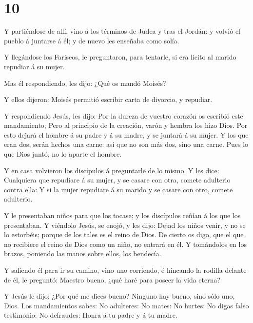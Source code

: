 \hypertarget{section-9}{%
\section{10}\label{section-9}}

 Y partiéndose de allí, vino á los términos de Judea y tras
el Jordán: y volvió el pueblo á juntarse á él; y de nuevo les enseñaba
como solía.

 Y llegándose los Fariseos, le preguntaron, para tentarle,
si era lícito al marido repudiar á su mujer.

 Mas él respondiendo, les dijo: ¿Qué os mandó Moisés?

 Y ellos dijeron: Moisés permitió escribir carta de
divorcio, y repudiar.

 Y respondiendo Jesús, les dijo: Por la dureza de vuestro
corazón os escribió este mandamiento;  Pero al principio de
la creación, varón y hembra los hizo Dios.  Por esto dejará
el hombre á su padre y á su madre, y se juntará á su mujer. 
Y los que eran dos, serán hechos una carne: así que no son más dos, sino
una carne.  Pues lo que Dios juntó, no lo aparte el hombre.

 Y en casa volvieron los discípulos á preguntarle de lo
mismo.  Y les dice: Cualquiera que repudiare á su mujer, y
se casare con otra, comete adulterio contra ella:  Y si la
mujer repudiare á su marido y se casare con otro, comete adulterio.

 Y le presentaban niños para que los tocase; y los
discípulos reñían á los que los presentaban.  Y viéndolo
Jesús, se enojó, y les dijo: Dejad los niños venir, y no se lo
estorbéis; porque de los tales es el reino de Dios.  De
cierto os digo, que el que no recibiere el reino de Dios como un niño,
no entrará en él.  Y tomándolos en los brazos, poniendo las
manos sobre ellos, los bendecía.

 Y saliendo él para ir su camino, vino uno corriendo, é
hincando la rodilla delante de él, le preguntó: Maestro bueno, ¿qué haré
para poseer la vida eterna?

 Y Jesús le dijo: ¿Por qué me dices bueno? Ninguno hay
bueno, sino sólo uno, Dios.  Los mandamientos sabes: No
adulteres: No mates: No hurtes: No digas falso testimonio: No defraudes:
Honra á tu padre y á tu madre.

